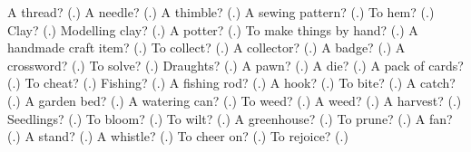 \begin{tcolorbox}[breakable,colback=teal!4,colframe=teal!35!black,title={Before you move on}]
A thread? (\textbf{}.) A needle? (\textbf{}.) A thimble? (\textbf{}.) A sewing pattern? (\textbf{}.) To hem? (\textbf{}.) Clay? (\textbf{}.) Modelling clay? (\textbf{}.) A potter? (\textbf{}.) To make things by hand? (\textbf{}.) A handmade craft item? (\textbf{}.) To collect? (\textbf{}.) A collector? (\textbf{}.) A badge? (\textbf{}.) A crossword? (\textbf{}.) To solve? (\textbf{}.) Draughts? (\textbf{}.) A pawn? (\textbf{}.) A die? (\textbf{}.) A pack of cards? (\textbf{}.) To cheat? (\textbf{}.) Fishing? (\textbf{}.) A fishing rod? (\textbf{}.) A hook? (\textbf{}.) To bite? (\textbf{}.) A catch? (\textbf{}.) A garden bed? (\textbf{}.) A watering can? (\textbf{}.) To weed? (\textbf{}.) A weed? (\textbf{}.) A harvest? (\textbf{}.) Seedlings? (\textbf{}.) To bloom? (\textbf{}.) To wilt? (\textbf{}.) A greenhouse? (\textbf{}.) To prune? (\textbf{}.) A fan? (\textbf{}.) A stand? (\textbf{}.) A whistle? (\textbf{}.) To cheer on? (\textbf{}.) To rejoice? (\textbf{}.)
\end{tcolorbox}
